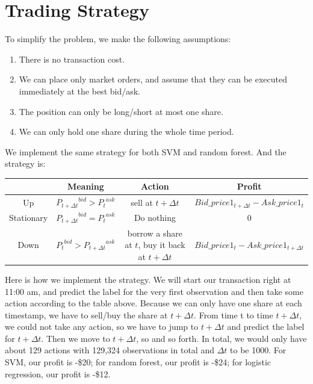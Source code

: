 \documentclass[11pt]{article}
\begin{document}
\section{Trading Strategy} \label{strategy}
To simplify the problem, we make the following assumptions:
\begin{enumerate}[label=(\alph*)]
\item There is no transaction cost.
\item We can place only market orders, and assume that they can be executed immediately at the best bid/ask.
\item The position can only be long/short at most one share.
\item We can only hold one share during the whole time period.
\end{enumerate}

We implement the same strategy for both SVM and random forest. And the strategy is:\\


\begin{center}
   \label{tab:title} 
  \begin{tabular}{|c | c | c | c|} 
    \hline
     & Meaning & Action & Profit \\
    \hline
    Up & ${P_{t+\Delta t}}^{bid} > {P_{t}}^{ask}$ & sell at $t+\Delta t$ & $Bid\_price1_{t+\Delta t} - Ask\_price1_t$ \\ 
    \hline
    Stationary &${P_{t+\Delta t}}^{bid} = {P_t}^{ask}$ &Do nothing & 0\\
    \hline
    Down &${P_{t}}^{bid} > {P_{t+\Delta t}}^{ask}$  & borrow a share at $t$, buy it back at $t+\Delta t$ & $Bid\_price1_{t} - Ask\_price1_{t+\Delta t}$ \\
    \hline
  \end{tabular}
\end{center}

Here is how we implement the strategy. We will start our transaction right at 11:00 am, and predict the label for the very first observation and then take some action according to the table above. Because we can only have one share at each timestamp, we have to sell/buy the share at $t+\Delta t$. From time t to time $t+\Delta t$, we could not take any action, so we have to jump to $t+\Delta t$ and predict the label for $t + \Delta t$. Then we move to $t+\Delta t$, so and so forth. In total, we would only have about 129 actions with 129,324 observations in total and $\Delta t$ to be 1000. For SVM, our profit is -\$20; for random forest, our profit is -\$24; for logistic regression, our profit is -\$12.
\end{document}
